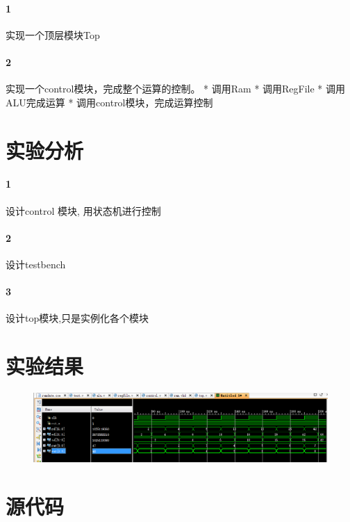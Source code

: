 \documentclass[UTF8]{ctexart}
\begin{document}
\paragraph{1}实现一个顶层模块Top
\paragraph{2}实现一个control模块，完成整个运算的控制。
* 调用Ram
* 调用RegFile
* 调用ALU完成运算
* 调用control模块，完成运算控制



\section{实验分析}
\paragraph{1}设计control 模块, 用状态机进行控制
\paragraph{2}设计testbench
\paragraph{3}设计top模块,只是实例化各个模块
\section{实验结果}

\begin{figure}[H]
  \centering
  \includegraphics[width=1\textwidth]{wave.png}
\end{figure}



\section{源代码}
\end{document}

